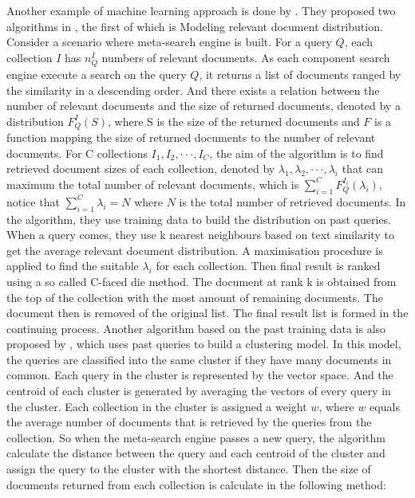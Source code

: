 Another example of machine learning approach is done by \cite{Voorhees1995}. They proposed two algorithms in \cite{Voorhees1995}, the first of which is Modeling relevant document distribution. Consider a scenario where meta-search engine is built. For a query $Q$, each collection $I$ has $n_Q^I$ numbers of relevant documents. As each component search engine execute a search on the query $Q$, it returns a list of documents ranged by the similarity in a descending order. And there exists a relation between the number of relevant documents and the size of returned documents,  denoted by a distribution $F_Q^I(S)$, where S is the size of the returned documents and $F$ is a function mapping the size of returned documents to the number of relevant documents. For C collections $I_1,I_2,\cdotp\cdotp\cdotp,I_C$, the aim of the algorithm is to find retrieved document sizes of each collection, denoted by $\lambda_1,\lambda_2,\cdotp\cdotp\cdotp,\lambda_i$ that can maximum the total number of relevant documents, which is $\sum\limits_{i=1}^CF_Q^{I_i}(\lambda_i)$, notice that $\sum\limits_{i=1}^C{\lambda_i}=N$ where $N$ is the total number of retrieved documents. In the algorithm, they use training data to build the distribution on past queries. When a query comes, they use k nearest neighbours based on text similarity to get the average relevant document distribution. A maximisation procedure is applied to find the suitable $\lambda_i$ for each collection. Then final result is ranked using a so called C-faced die method. The document at rank k is obtained from the top of the collection with the most amount of remaining documents. The document then is removed of the original list. The final result list is formed in the continuing process. Another algorithm based on the past training data is also proposed by \cite{Voorhees1995}, which uses past queries to build a clustering model. In this model, the queries are classified into the same cluster if they have many documents in common. Each query in the cluster is represented by the vector space. And the centroid of each cluster is generated by averaging the vectors of every query in the cluster. Each collection in the cluster is assigned a weight $w$, where $w$ equals the average number of documents that is retrieved by the queries from the collection. So when the meta-search engine passes a new query, the algorithm calculate the distance between the query and each centroid of the cluster and assign the query to the cluster with the shortest distance.  Then the size of documents returned from each collection is calculate in the following method:

